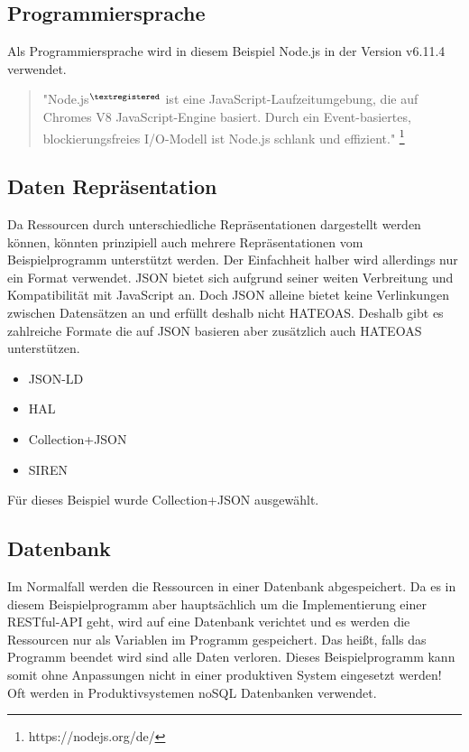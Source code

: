 \documentclass[listof=totoc]{article}
\begin{document}
	\subsection{Programmiersprache}
	Als Programmiersprache wird in diesem Beispiel Node.js in der Version v6.11.4 verwendet.
	\begin{quote}
		"Node.js$^{\tiny{\textregistered}}$ ist eine JavaScript-Laufzeitumgebung, die auf Chromes V8 JavaScript-Engine basiert. Durch ein Event-basiertes, blockierungsfreies I/O-Modell ist Node.js schlank und effizient."
		\footnote{https://nodejs.org/de/}
	\end{quote}
	\subsection{Daten Repräsentation}
	Da Ressourcen durch unterschiedliche Repräsentationen dargestellt werden können, könnten prinzipiell auch mehrere Repräsentationen vom Beispielprogramm unterstützt werden. Der Einfachheit halber wird allerdings nur ein Format verwendet.
	\ac{JSON} bietet sich aufgrund seiner weiten Verbreitung und Kompatibilität mit JavaScript an. Doch \ac{JSON} alleine bietet keine Verlinkungen zwischen Datensätzen an und erfüllt deshalb nicht \ac{HATEOAS}. Deshalb gibt es zahlreiche Formate die auf \ac{JSON} basieren aber zusätzlich auch \ac{HATEOAS} unterstützen. \cite{HATEOAS_FORMATS}
	\begin{itemize} 
		\setlength{\itemsep}{0pt} 
		\item \ac{JSON-LD}
		\item \ac{HAL}
		\item Collection+\ac{JSON}
		\item \ac{SIREN}
	\end{itemize}
	Für dieses Beispiel wurde Collection+\ac{JSON}\cite{CJ} ausgewählt.
	\subsection{Datenbank}
	Im Normalfall werden die Ressourcen in einer Datenbank abgespeichert. Da es in diesem Beispielprogramm aber hauptsächlich um die Implementierung einer \ac{REST}ful-\ac{API} geht,
	wird auf eine Datenbank verichtet und es werden die Ressourcen nur als Variablen im Programm gespeichert. Das heißt, falls das Programm beendet wird sind alle Daten verloren.
	Dieses Beispielprogramm kann somit ohne Anpassungen nicht in einer produktiven System eingesetzt werden! Oft werden in Produktivsystemen \ac{noSQL} Datenbanken verwendet.
	
\end{document}
